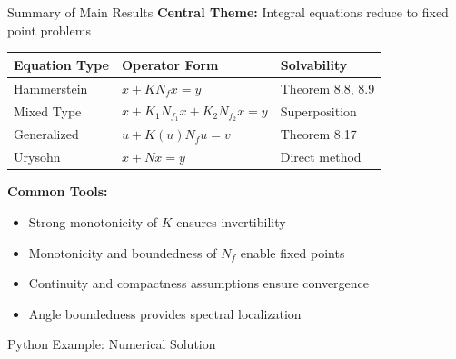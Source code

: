 \documentclass[aspectratio=169,10pt]{beamer}
\theoremstyle{plain}
\theoremstyle{definition}
\begin{document}
\begin{frame}{Summary of Main Results}
  \vspace{0.3cm}
  \textbf{Central Theme:} Integral equations reduce to fixed point problems

  \begin{center}
    \begin{tabular}{|l|l|l|}
      \hline
      \textbf{Equation Type} & \textbf{Operator Form} & \textbf{Solvability} \\
      \hline
      Hammerstein & $x + KN_f x = y$ & Theorem 8.8, 8.9 \\
      \hline
      Mixed Type & $x + K_1 N_{f_1} x + K_2 N_{f_2} x = y$ & Superposition \\
      \hline
      Generalized & $u + K(u)N_f u = v$ & Theorem 8.17 \\
      \hline
      Urysohn & $x + Nx = y$ & Direct method \\
      \hline
    \end{tabular}
  \end{center}

  \vspace{0.3cm}
  \textbf{Common Tools:}
  \begin{itemize}
    \item Strong monotonicity of $K$ ensures invertibility
    \item Monotonicity and boundedness of $N_f$ enable fixed points
    \item Continuity and compactness assumptions ensure convergence
    \item Angle boundedness provides spectral localization
  \end{itemize}
\end{frame}

\begin{frame}[fragile]{Python Example: Numerical Solution}
  \vspace{0.2cm}
  
\end{frame}
\end{document}
